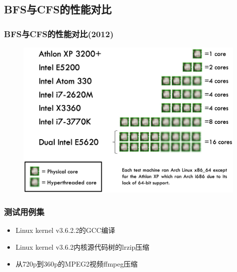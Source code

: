\subsection{BFS与CFS的性能对比} %
\begin{frame}[fragile]
    \frametitle{BFS与CFS的性能对比(2012)}
    \begin{figure}
    \includegraphics[width=0.6\linewidth]{figs/test-machines.png}
    \end{figure}

\end{frame}
% 
% 
\begin{frame}[fragile]
    \frametitle{测试用例集}
    \begin{itemize}
        \item Linux kernel v3.6.2.2的GCC编译
        \item Linux kernel v3.6.2内核源代码树的lrzip压缩
        \item 从720p到360p的MPEG2视频ffmpeg压缩
        \end{itemize}
\end{frame}
% 
% 
% 
